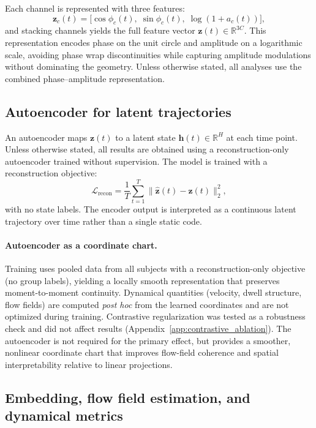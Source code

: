 \documentclass[5p,twocolumn,authoryear]{elsarticle}
\begin{document}
Each channel is represented with three features:
\begin{equation}
\mathbf{z}_c(t) = \big[\cos\phi_c(t),\; \sin\phi_c(t),\; \log(1 + a_c(t))\big],
\end{equation}
and stacking channels yields the full feature vector $\mathbf{z}(t) \in \mathbb{R}^{3C}$. This representation encodes phase on the unit circle and amplitude on a logarithmic scale, avoiding phase wrap discontinuities while capturing amplitude modulations without dominating the geometry. Unless otherwise stated, all analyses use the combined phase--amplitude representation.

\subsection{Autoencoder for latent trajectories}

An autoencoder maps $\mathbf{z}(t)$ to a latent state $\mathbf{h}(t) \in \mathbb{R}^{H}$ at each time point. Unless otherwise stated, all results are obtained using a reconstruction-only autoencoder trained without supervision. The model is trained with a reconstruction objective:
\begin{equation}
\mathcal{L}_{\mathrm{recon}} = \frac{1}{T}\sum_{t=1}^{T}\|\hat{\mathbf{z}}(t) - \mathbf{z}(t)\|_2^2,
\end{equation}
with no state labels. The encoder output is interpreted as a continuous latent trajectory over time rather than a single static code.

\paragraph{Autoencoder as a coordinate chart.}
Training uses pooled data from all subjects with a reconstruction-only objective (no group labels), yielding a locally smooth representation that preserves moment-to-moment continuity. Dynamical quantities (velocity, dwell structure, flow fields) are computed \emph{post hoc} from the learned coordinates and are not optimized during training. Contrastive regularization was tested as a robustness check and did not affect results (Appendix~\ref{app:contrastive_ablation}). The autoencoder is not required for the primary effect, but provides a smoother, nonlinear coordinate chart that improves flow-field coherence and spatial interpretability relative to linear projections.

\subsection{Embedding, flow field estimation, and dynamical metrics}
\end{document}
